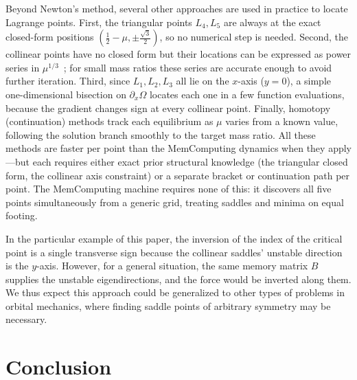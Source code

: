 \documentclass[aip,preprint,amsmath,amssymb,floatfix]{revtex4-2}
\begin{document}
Beyond Newton's method, several other approaches are used in practice to locate Lagrange points.
First, the triangular points $L_4, L_5$ are always at the exact closed-form positions
$(\frac{1}{2}-\mu,\pm\frac{\sqrt{3}}{2})$, so no numerical step is needed.
Second, the collinear points have no closed form but their locations can be expressed as
power series in $\mu^{1/3}$~\cite{szebehely1967}; for small mass ratios these series are
accurate enough to avoid further iteration.
Third, since $L_1,L_2,L_3$ all lie on the $x$-axis ($y=0$), a simple one-dimensional
bisection on $\partial_x\Omega$ locates each one in a few function evaluations, because
the gradient changes sign at every collinear point.
Finally, homotopy (continuation) methods track each equilibrium as $\mu$ varies from a
known value, following the solution branch smoothly to the target mass ratio.
All these methods are faster per point than the MemComputing dynamics when they
apply---but each requires either exact prior structural knowledge (the triangular closed
form, the collinear axis constraint) or a separate bracket or continuation path per
point. The MemComputing machine requires none of this: it discovers all five points
simultaneously from a generic grid, treating saddles and minima on equal footing. 

In the particular example of this paper, the inversion of the index of the critical point is a single
transverse sign because the collinear saddles' unstable direction is the $y$-axis. However, for a general situation, the same memory matrix $B$ supplies the unstable eigendirections, and the force would be inverted along them. We thus expect this approach could be generalized to other types of problems in orbital mechanics, where 
finding saddle points of arbitrary symmetry may be necessary. 


\section{Conclusion}\label{sec:conclusion}
\end{document}
